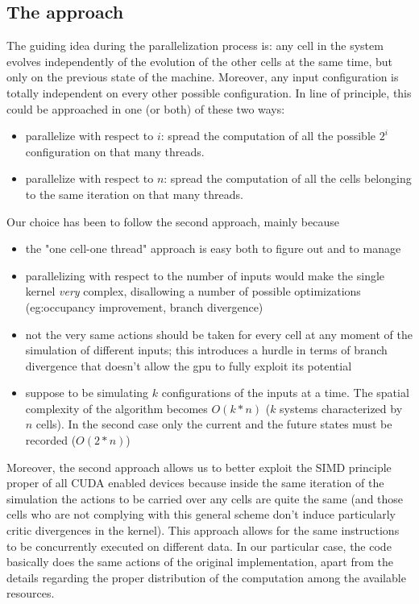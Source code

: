 \subsection{The approach}
The guiding idea during the parallelization process is: any cell in the system evolves independently of the evolution of the other cells at the same time, but only on the previous state of the machine. Moreover, any input configuration is totally independent on every other possible configuration. In line of principle, this could be approached in one (or both) of these two ways:
\begin{itemize}
\item parallelize with respect to $i$: spread the computation of all the possible $2^i$ configuration on that many threads.
\item parallelize with respect to $n$: spread the computation of all the cells belonging to the same iteration on that many threads.
\end{itemize}
Our choice has been to follow the second approach, mainly because 
\begin{itemize}
\item the "one cell-one thread" approach is easy both to figure out and to manage
\item parallelizing with respect to the number of inputs would make the single kernel \textsl{very} complex, disallowing a number of possible optimizations (eg:occupancy improvement, branch divergence)  
\item not the very same actions should be taken for every cell at any moment of the simulation of different inputs; this introduces a hurdle in terms of branch divergence that doesn't allow the gpu to fully exploit its potential
\item suppose to be simulating $k$ configurations of the inputs at a time. The spatial complexity of the algorithm becomes $O(k*n)$ ($k$ systems characterized by $n$ cells). In the second case only the current and the future states must be recorded ($O(2*n)$)
\end{itemize} 

Moreover, the second approach allows us to better exploit the SIMD principle proper of all CUDA enabled devices because inside the same iteration of the simulation the actions to be carried over any cells are quite the same (and those cells who are not complying with this general scheme don't induce particularly critic divergences in the kernel). This approach allows for the same instructions to be concurrently executed on different data. In our particular case, the code basically does the same actions of the original implementation, apart from the details regarding the proper distribution of the computation among the available resources.

